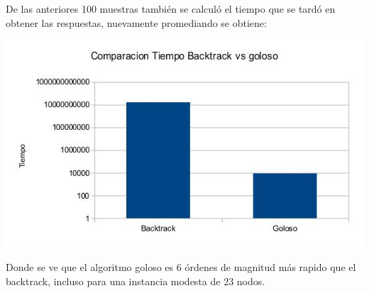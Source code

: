 De las anteriores 100 muestras también se calculó el tiempo que se tardó en obtener las respuestas, nuevamente promediando se obtiene:

\includegraphics[scale=0.5]{Ej3/tiempos.jpg}

Donde se ve que el algoritmo goloso es $6$ órdenes de magnitud más rapido que el backtrack, incluso para una instancia modesta de $23$ nodos.
